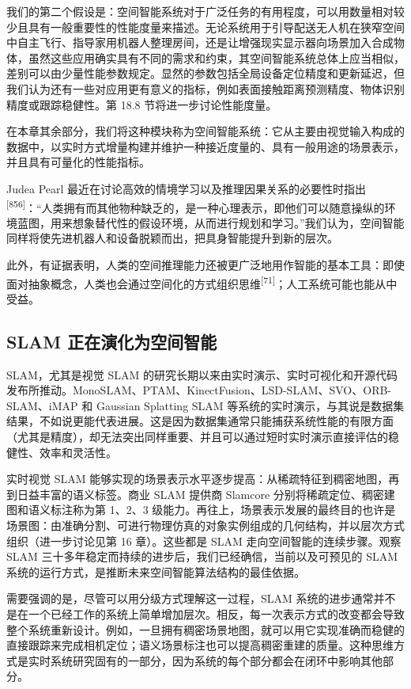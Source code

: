 我们的第二个假设是：空间智能系统对于广泛任务的有用程度，可以用数量相对较少且具有一般重要性的性能度量来描述。无论系统用于引导配送无人机在狭窄空间中自主飞行、指导家用机器人整理房间，还是让增强现实显示器向场景加入合成物体，虽然这些应用确实具有不同的需求和约束，其空间智能系统总体上应当相似，差别可以由少量性能参数规定。显然的参数包括全局设备定位精度和更新延迟，但我们认为还有一些对应用更有意义的指标，例如表面接触距离预测精度、物体识别精度或跟踪稳健性。第 18.8 节将进一步讨论性能度量。

在本章其余部分，我们将这种模块称为空间智能系统：它从主要由视觉输入构成的数据中，以实时方式增量构建并维护一种接近度量的、具有一般用途的场景表示，并且具有可量化的性能指标。

Judea Pearl 最近在讨论高效的情境学习以及推理因果关系的必要性时指出\textsuperscript{[856]}：“人类拥有而其他物种缺乏的，是一种心理表示，即他们可以随意操纵的环境蓝图，用来想象替代性的假设环境，从而进行规划和学习。”我们认为，空间智能同样将使先进机器人和设备脱颖而出，把具身智能提升到新的层次。

此外，有证据表明，人类的空间推理能力还被更广泛地用作智能的基本工具：即使面对抽象概念，人类也会通过空间化的方式组织思维\textsuperscript{[71]}；人工系统可能也能从中受益。

\subsection{SLAM 正在演化为空间智能}

SLAM，尤其是视觉 SLAM 的研究长期以来由实时演示、实时可视化和开源代码发布所推动。MonoSLAM、PTAM、KinectFusion、LSD-SLAM、SVO、ORB-SLAM、iMAP 和 Gaussian Splatting SLAM 等系统的实时演示，与其说是数据集结果，不如说更能代表进展。这是因为数据集通常只能捕获系统性能的有限方面（尤其是精度），却无法突出同样重要、并且可以通过短时实时演示直接评估的稳健性、效率和灵活性。

实时视觉 SLAM 能够实现的场景表示水平逐步提高：从稀疏特征到稠密地图，再到日益丰富的语义标签。商业 SLAM 提供商 Slamcore 分别将稀疏定位、稠密建图和语义标注称为第 1、2、3 级能力。再往上，场景表示发展的最终目的也许是场景图：由准确分割、可进行物理仿真的对象实例组成的几何结构，并以层次方式组织（进一步讨论见第 16 章）。这些都是 SLAM 走向空间智能的连续步骤。观察 SLAM 三十多年稳定而持续的进步后，我们已经确信，当前以及可预见的 SLAM 系统的运行方式，是推断未来空间智能算法结构的最佳依据。

需要强调的是，尽管可以用分级方式理解这一过程，SLAM 系统的进步通常并不是在一个已经工作的系统上简单增加层次。相反，每一次表示方式的改变都会导致整个系统重新设计。例如，一旦拥有稠密场景地图，就可以用它实现准确而稳健的直接跟踪来完成相机定位；语义场景标注也可以提高稠密重建的质量。这种思维方式是实时系统研究固有的一部分，因为系统的每个部分都会在闭环中影响其他部分。

